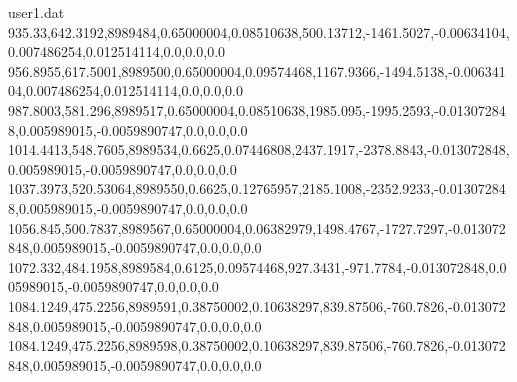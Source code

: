 \begin{filecontents}{user1.dat}
935.33,642.3192,8989484,0.65000004,0.08510638,500.13712,-1461.5027,-0.00634104,0.007486254,0.012514114,0.0,0.0,0.0
956.8955,617.5001,8989500,0.65000004,0.09574468,1167.9366,-1494.5138,-0.00634104,0.007486254,0.012514114,0.0,0.0,0.0
987.8003,581.296,8989517,0.65000004,0.08510638,1985.095,-1995.2593,-0.013072848,0.005989015,-0.0059890747,0.0,0.0,0.0
1014.4413,548.7605,8989534,0.6625,0.07446808,2437.1917,-2378.8843,-0.013072848,0.005989015,-0.0059890747,0.0,0.0,0.0
1037.3973,520.53064,8989550,0.6625,0.12765957,2185.1008,-2352.9233,-0.013072848,0.005989015,-0.0059890747,0.0,0.0,0.0
1056.845,500.7837,8989567,0.65000004,0.06382979,1498.4767,-1727.7297,-0.013072848,0.005989015,-0.0059890747,0.0,0.0,0.0
1072.332,484.1958,8989584,0.6125,0.09574468,927.3431,-971.7784,-0.013072848,0.005989015,-0.0059890747,0.0,0.0,0.0
1084.1249,475.2256,8989591,0.38750002,0.10638297,839.87506,-760.7826,-0.013072848,0.005989015,-0.0059890747,0.0,0.0,0.0
1084.1249,475.2256,8989598,0.38750002,0.10638297,839.87506,-760.7826,-0.013072848,0.005989015,-0.0059890747,0.0,0.0,0.0
\end{filecontents}